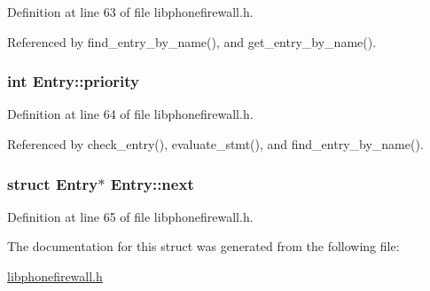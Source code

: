 Definition at line 63 of file libphonefirewall.h.

Referenced by find\_\-entry\_\-by\_\-name(), and get\_\-entry\_\-by\_\-name().\hypertarget{structEntry_85af261b3171c257892b54a7200da061}{
\subsubsection{\setlength{\rightskip}{0pt plus 5cm}int {\bf Entry::priority}}}
\label{structEntry_85af261b3171c257892b54a7200da061}




Definition at line 64 of file libphonefirewall.h.

Referenced by check\_\-entry(), evaluate\_\-stmt(), and find\_\-entry\_\-by\_\-name().\hypertarget{structEntry_08cba741f383cd7da0f3ab9aee6e3cd5}{
\subsubsection{\setlength{\rightskip}{0pt plus 5cm}struct {\bf Entry}$\ast$ {\bf Entry::next}}}
\label{structEntry_08cba741f383cd7da0f3ab9aee6e3cd5}




Definition at line 65 of file libphonefirewall.h.

The documentation for this struct was generated from the following file:\begin{CompactItemize}
\item 
\hyperlink{libphonefirewall_8h}{libphonefirewall.h}\end{CompactItemize}
